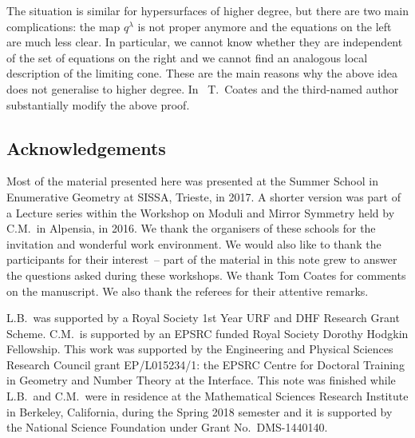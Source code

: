 \documentclass[pdftex]{sigma}
\numberwithin{equation}{section}
\theoremstyle{plain}
\theoremstyle{definition}
\theoremstyle{remark}
\begin{document}
\begin{Remark}
The situation is similar for hypersurfaces of higher degree, but there are two main complications: the map $q^{\lambda}$ is not proper anymore and the equations on the left are much less clear. In particular, we cannot know whether they are independent of the set of equations on the right and we cannot find an analogous local description of the limiting cone. These are the main reasons why the above idea does not generalise to higher degree. In~\cite{eu3} T.~Coates and the third-named author substantially modify the above proof.
\end{Remark}

\subsection*{Acknowledgements} Most of the material presented here was presented at the Summer School in Enumerative Geometry at SISSA, Trieste, in 2017. A shorter version was part of a Lecture series within the Workshop on Moduli and Mirror Symmetry held by C.M.\ in Alpensia, in 2016. We thank the organisers of these schools for the invitation and wonderful work environment. We would also like to thank the participants for their interest~-- part of the material in this note grew to answer the questions asked during these workshops. We thank Tom Coates for comments on the manuscript. We also thank the referees for their attentive remarks.

L.B.\ was supported by a Royal Society 1st Year URF and DHF Research Grant Scheme.
C.M.\ is supported by an EPSRC funded Royal Society Dorothy Hodgkin Fellowship.
This work was supported by the Engineering and Physical Sciences Research Council grant EP/L015234/1: the EPSRC Centre for Doctoral Training in Geometry and Number Theory at the Interface. This note was finished while L.B.\ and C.M.\ were in residence at the Mathematical Sciences Research Institute in Berkeley, California, during the Spring 2018 semester and it is supported by the National Science Foundation under Grant No.~DMS-1440140.
\end{document}
